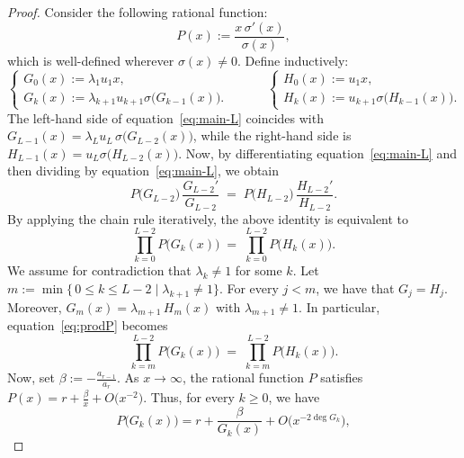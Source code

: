 \documentclass{article} %
\def\eqref#1{equation~\ref{#1}}
\theoremstyle{plain}%
\theoremstyle{definition}
\theoremstyle{remark}
\begin{document}
\begin{proof}
Consider the following rational function:
\begin{equation}  
   P(x):=\frac{x\,\sigma'(x)}{\sigma(x)},
\end{equation}
which is well-defined wherever $\sigma(x)\ne0$. Define inductively: 
\begin{equation}
\begin{cases}
     G_{0}(x) :=\lambda_{1} u_1 x, \\
      G_{k}(x):= \lambda_{k+1} u_{k+1} \sigma\!\bigl(G_{k-1}(x)\bigr). 
\end{cases}
\hspace{3em}
\begin{cases}
H_{0}(x) :=u_1x, \\
H_{k}(x) := u_{k+1}\sigma \bigl(H_{k-1}(x)\bigr).
\end{cases}\end{equation}
The left-hand side of \eqref{eq:main-L} coincides with
\(G_{L-1}(x)= \lambda_Lu_L\,\sigma\!\bigl(G_{L-2}(x)\bigr)\), while the right-hand side is
\(H_{L-1}(x) = u_L \sigma \bigl(H_{L-2}(x)\bigr) \). Now, by differentiating \eqref{eq:main-L} and then  dividing by \eqref{eq:main-L}, we obtain
\begin{equation}   
    P\bigl(G_{L-2}\bigr)\,\frac{G_{L-2}'}{G_{L-2}}
  \;=\;
  P\bigl(H_{L-2}\bigr)\,\frac{H_{L-2}'}{H_{L-2}}.
\end{equation}
By applying the chain rule iteratively, the above identity is equivalent to
\begin{equation}\label{eq:prodP}
  \prod_{k=0}^{L-2} P\!\bigl(G_k(x)\bigr)
  \;=\;
  \prod_{k=0}^{L-2} P\!\bigl(H_k(x)\bigr).
\end{equation}
We assume for contradiction that $\lambda_k \not = 1$ for some $k$.  Let $m:=\min\{\,0\le k\le L-2 \mid \lambda_{k+1}\neq1\}$. For every $j<m$, we have that $G_{j}=H_{j}$. Moreover,  $G_{m}(x)=\lambda_{m+1}\,H_{m}(x)$ with $\lambda_{m+1}\neq1$. 
In particular, \eqref{eq:prodP} becomes 
\begin{equation}\label{eq:prodPshort}
  \prod_{k=m}^{L-2} P\!\bigl(G_k(x)\bigr)
  \;=\;
  \prod_{k=m}^{L-2} P\!\bigl(H_k(x)\bigr).
\end{equation}
Now, set $\beta := -\frac{a_{r-1}}{a_r}$.
As $x \to \infty$, the rational function $P$ satisfies $P(x)=r+\frac{\beta}{x}+O\!\bigl(x^{-2}\bigr)$. Thus, for every $k\ge0$, we have
\begin{equation}    
      P\!\bigl(G_{k}(x)\bigr)=
      r+\frac{\beta}{G_{k}(x)}+O\!\bigl(x^{-2\deg G_{k}}\bigr),

\end{equation}
\end{proof}
\end{document}
